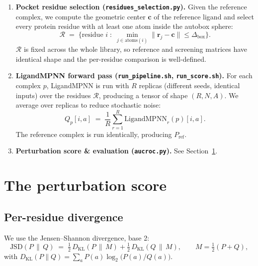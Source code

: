 \documentclass[11pt]{article}
\newcommand{\jsd}{\mathrm{JSD}}
\newcommand{\kl}{D_{\mathrm{KL}}}
\begin{document}
\begin{enumerate}[leftmargin=*, label=\textbf{(\arabic*)}]
  Failed poses are dropped before LigandMPNN sees them.

  \item \textbf{Pocket residue selection (\texttt{residues\_selection.py}).}
  Given the reference complex, we compute the geometric center
  $\mathbf{c}$ of the reference ligand and select every protein residue
  with at least one atom inside the autobox sphere:
  \[
  \mathcal{R} \;=\; \bigl\{ \text{residue $i$} \;:\;
    \min_{j \in \text{atoms}(i)} \|\mathbf{r}_j - \mathbf{c}\|
    \le \Delta_{\mathrm{box}} \bigr\}.
  \]
  $\mathcal{R}$ is fixed across the whole library, so reference and
  screening matrices have identical shape and the per-residue comparison
  is well-defined.

  \item \textbf{LigandMPNN forward pass (\texttt{run\_pipeline.sh},
  \texttt{run\_score.sh}).} For each complex $p$, LigandMPNN is run with
  $R$ replicas (different seeds, identical inputs) over the residues
  $\mathcal{R}$, producing a tensor of shape $(R, N, A)$. We average over
  replicas to reduce stochastic noise:
  \[
  Q_p[i, a] \;=\; \frac{1}{R} \sum_{r=1}^{R} \mathrm{LigandMPNN}_r(p)[i, a].
  \]
  The reference complex is run identically, producing
  $P_{\mathrm{ref}}$.

  \item \textbf{Perturbation score \& evaluation (\texttt{aucroc.py}).}
  See Section~\ref{sec:score}.

\end{enumerate}

\section{The perturbation score}
\label{sec:score}

\subsection{Per-residue divergence}

We use the Jensen--Shannon divergence, base 2:
\begin{equation}
\jsd(P \,\|\, Q) \;=\; \tfrac{1}{2}\,\kl(P \,\|\, M)
                  + \tfrac{1}{2}\,\kl(Q \,\|\, M),
\qquad
M = \tfrac{1}{2}(P + Q),
\label{eq:jsd}
\end{equation}
with $\kl(P\|Q) = \sum_a P(a)\log_2\!\bigl(P(a)/Q(a)\bigr)$.
\end{document}
